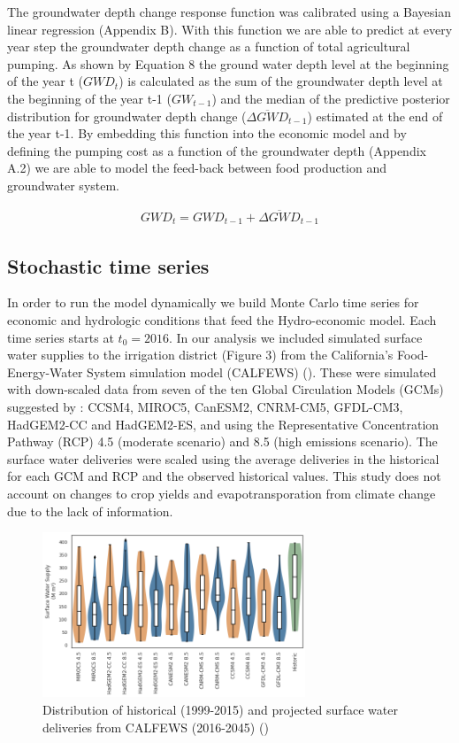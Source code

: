 \documentclass[11pt,a4paper]{article}
\begin{document}
The groundwater depth change response function was calibrated using a Bayesian linear regression (Appendix B). With this function we are able to predict at every year step the groundwater depth change as a function of total agricultural pumping. As shown by Equation 8 the ground water depth level at the beginning of the year t ($GWD_{t}$) is calculated as the sum of the groundwater depth level at the beginning of the year t-1 ($GW_{t-1}$) and the median of the predictive posterior distribution for groundwater depth change ($\overline{\Delta GWD}_{t-1}$) estimated at the end of the year t-1. By embedding this function into the economic model and by defining the pumping cost as a function of the groundwater depth (Appendix A.2) we are able to model the feed-back between food production and groundwater system.

\begin{align}
GWD_{t} = GWD_{t-1} + \overline{\Delta GWD}_{t-1}
\end{align}

\subsection{Stochastic time series}

In order to run the model dynamically we build Monte Carlo time series for economic and hydrologic conditions that feed the Hydro-economic model. Each time series starts at $t_{0}=2016$. In our analysis we included simulated surface water supplies to the irrigation district (Figure 3) from the California’s Food-Energy-Water System simulation model (CALFEWS) (\cite{zeff_californias_2021}). These were simulated with down-scaled data from seven of the ten Global Circulation Models (GCMs) suggested by \textcite{pierce_climate_2018}: CCSM4, MIROC5, CanESM2, CNRM-CM5, GFDL-CM3, HadGEM2-CC and HadGEM2-ES, and using the Representative Concentration Pathway (RCP) 4.5 (moderate scenario) and 8.5 (high emissions scenario). The surface water deliveries were scaled using the average deliveries in the historical for each GCM and RCP and the observed historical values. This study does not account on changes to crop yields and evapotransporation from climate change due to the lack of information. 

\begin{figure}[H]
    \centering
    \includegraphics[width=0.7\textwidth]{gcm_surface_water.png}
    \caption{Distribution of historical (1999-2015) and projected surface water deliveries from CALFEWS (2016-2045) (\cite{zeff_californias_2021})} \label{fig:SWSemitropic}
\end{figure}
\end{document}
